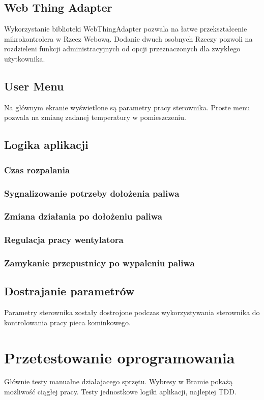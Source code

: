 \documentclass[12pt]{report}
\begin{document}
 \section{Web Thing Adapter}
 Wykorzystanie biblioteki WebThingAdapter pozwala na łatwe przekształcenie mikrokontrolera w Rzecz Webową.
 Dodanie dwuch osobnych Rzeczy pozwoli na rozdzieleni funkcji administracyjnych od opcji przeznaczonych dla zwykłego użytkownika.
 
 \section{User Menu}
 Na głównym ekranie wyświetlone są parametry pracy sterownika.
 Proste menu pozwala na zmianę zadanej temperatury w pomieszczeniu.
 
 \section{Logika aplikacji}
 \subsection{Czas rozpalania}
 \subsection{Sygnalizowanie potrzeby dołożenia paliwa}
 \subsection{Zmiana działania po dołożeniu paliwa}
 \subsection{Regulacja pracy wentylatora}
 \subsection{Zamykanie przepustnicy po wypaleniu paliwa}
 
 \section{Dostrajanie parametrów}
 Parametry sterownika zostały dostrojone podczas wykorzystywania sterownika do kontrolowania pracy pieca kominkowego.
 
 
 \chapter{Przetestowanie oprogramowania}
 Głównie testy manualne działajacego sprzętu.
 Wybresy w Bramie pokażą możliwość ciągłej pracy.
 Testy jednostkowe logiki aplikacji, najlepiej TDD.
 
\end{document}

